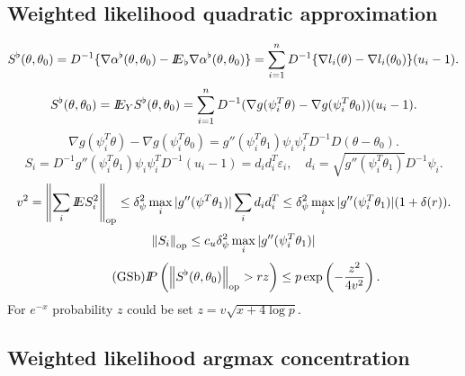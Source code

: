	



\usepackage{flowchart}
\usetikzlibrary{arrows}

\usepackage{natbib}






\subsection{Weighted likelihood quadratic approximation}


\[
S^{\flat}(\theta, \theta_0) = D^{-1} \{\nabla \alphab12 -  \Eb \nabla \alphab12 \}
= \sum_{i=1}^{n} D^{-1} \{\nabla l_i(\theta) - \nabla l_i(\theta_0) \}  (u_i-1).
\]
\[
S^{\flat}(\theta, \theta_0) = I\!\!E_{Y} S^{\flat}(\theta, \theta_0) = \sum_{i = 1}^n D^{-1} (\nabla g(\psi_i^{T} \theta) - \nabla g(\psi_i^{T} \theta_0))
(u_i-1).
\] 
\[
\nabla g(\psi_i^{T} \theta) - \nabla g(\psi_i^{T} \theta_0) =  g''(\psi_i^{T} \theta_1) \psi_i \psi_i^{T} D^{-1} D (\theta - \theta_0).
\]
\[
S_i = D^{-1} g''(\psi_i^{T} \theta_1) \psi_i \psi_i^{T} D^{-1}(u_i - 1) = d_i d_i^{T} \varepsilon_i, 
\quad
d_i = \sqrt{g''(\psi_i^{T} \theta_1)}  D^{-1}  \psi_i.
\]
\[
v^2 = \left\Vert \sum_i I\!\!E S_i^2 \right\Vert_{\operatorname{op}} \leq  \delta^2_{\psi} \max_i | g''(\psi^T \theta_1) | \sum_i d_i d_i^{T} \leq  \delta^2_{\psi} \max_i | g''(\psi_i^T \theta_1) | (1 + \delta (r)). 
\]
\[
\left\Vert S_i \right\Vert_{\operatorname{op}} \leq c_u \delta^2_{\psi} \max_i | g''(\psi_i^T \theta_1) |
\]
\begin{equation}\tag{GSb}
\label{GSboot}
I\!\!P \left( \left\Vert S^{\flat}(\theta, \theta_0) \right\Vert_{\operatorname{op}} > r z \right) \leq  p \exp \left(- \frac{z^2}{4 v^2} \right). 
\end{equation}
For $e^{-x}$ probability $z$ could be set $z = v \sqrt{x + 4 \log p}$.


\subsection{Weighted likelihood argmax concentration}

